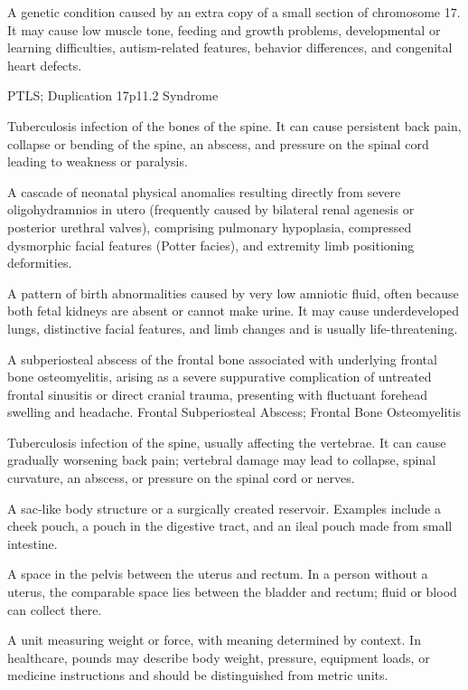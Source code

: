 A genetic condition caused by an extra copy of a small section of chromosome 17. It may cause low muscle tone, feeding and growth problems, developmental or learning difficulties, autism-related features, behavior differences, and congenital heart defects.

\synonyms
PTLS; Duplication 17p11.2 Syndrome

 Tuberculosis infection of the bones of the spine. It can cause persistent back pain, collapse or bending of the spine, an abscess, and pressure on the spinal cord leading to weakness or paralysis.

 A cascade of neonatal physical anomalies resulting directly from severe oligohydramnios in utero (frequently caused by bilateral renal agenesis or posterior urethral valves), comprising pulmonary hypoplasia, compressed dysmorphic facial features (Potter facies), and extremity limb positioning deformities.

 A pattern of birth abnormalities caused by very low amniotic fluid, often because both fetal kidneys are absent or cannot make urine. It may cause underdeveloped lungs, distinctive facial features, and limb changes and is usually life-threatening.

 A subperiosteal abscess of the frontal bone associated with underlying frontal bone osteomyelitis, arising as a severe suppurative complication of untreated frontal sinusitis or direct cranial trauma, presenting with fluctuant forehead swelling and headache.
\synonyms
Frontal Subperiosteal Abscess; Frontal Bone Osteomyelitis

 Tuberculosis infection of the spine, usually affecting the vertebrae. It can cause gradually worsening back pain; vertebral damage may lead to collapse, spinal curvature, an abscess, or pressure on the spinal cord or nerves.

 A sac-like body structure or a surgically created reservoir. Examples include a cheek pouch, a pouch in the digestive tract, and an ileal pouch made from small intestine.

 A space in the pelvis between the uterus and rectum. In a person without a uterus, the comparable space lies between the bladder and rectum; fluid or blood can collect there.

 A unit measuring weight or force, with meaning determined by context. In healthcare, pounds may describe body weight, pressure, equipment loads, or medicine instructions and should be distinguished from metric units.


